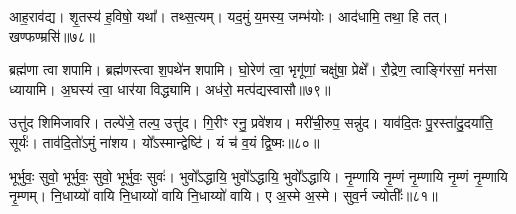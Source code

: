आह॒राव॑द्य।
शृ॒तस्य॑ ह॒विषो॒ यथा᳚।
तथ्स॒त्यम्।
यद॒मुं य॒मस्य॒ जम्भ॑योः।
आद॑धामि॒ तथा॒ हि तत्।
खण्फण्म्रसि॑॥७८॥



ब्रह्म॑णा त्वा शपामि।
ब्रह्म॑णस्त्वा श॒पथे॑न शपामि।
घो॒रेण॑ त्वा॒ भृगू॑णां॒ चक्षु॑षा॒ प्रेक्षे᳚।
रौ॒द्रेण॒ त्वाङ्गि॑रसां॒ मन॑सा ध्यायामि।
अ॒घस्य॑ त्वा॒ धार॑या विद्ध्यामि।
अध॑रो॒ मत्प॑द्यस्वासौ॥७९॥%



उत्तु॑द शिमिजावरि।
तल्पे॑जे॒ तल्प॒ उत्तु॑द।
गि॒रीꣳ रनु॒ प्रवे॑शय।
मरी॑ची॒रुप॒ सन्नु॑द।
याव॑दि॒तः पु॒रस्ता॑दु॒दया॑ति॒ सूर्यः॑।
ताव॑दि॒तो॑ऽमुं ना॑शय।
यो᳚ऽस्मान्द्वेष्टि॑।
यं च॑ व॒यं द्वि॒ष्मः॥८०॥



भूर्भुवः॒ सुवो॒ भूर्भुवः॒ सुवो॒ भूर्भुवः॒ सुवः॑।
भुवो᳚ऽद्धायि॒ भुवो᳚ऽद्धायि॒ भुवो᳚ऽद्धायि।
नृ॒म्णायि नृ॒म्णं नृ॒म्णायि नृ॒म्णं नृ॒म्णायि नृ॒म्णम्।
नि॒धाय्यो॑ वायि नि॒धाय्यो॑ वायि नि॒धाय्यो॑ वायि।
ए अ॒स्मे अ॒स्मे।
सुव॒र्न ज्योतीः᳚॥८१॥

